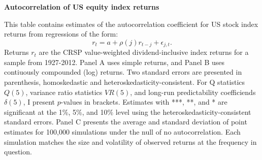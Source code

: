 \documentclass[12pt]{article}
\begin{document}
\clearpage

\begin{table}[h]
\caption{\textbf{Autocorrelation of US equity index returns}} \label{table_sighats}
\small{This table contains estimates of the autocorrelation coefficient for US stock index returns from regressions of the form: $$r_{t} = a + \rho(j) r_{t-j} + \epsilon_{j,t}.$$
Returns $r_t$ are the CRSP value-weighted dividend-inclusive index returns for a sample from 1927-2012. Panel A uses simple returns, and Panel B uses contiuously compounded (log) returns. Two standard errors are presented in parenthesis, homoskedastic and heteroskedasticity-consistent. For Q statistics $Q(5)$, variance ratio statistics $VR(5)$, and long-run predictability coefficiends $\delta(5)$, I present $p$-values in brackets. Estimates with ***, **, and * are significant at the 1\%, 5\%, and 10\% level using the heteroskedasticity-consistent standard errors. Panel C presents the average and standard deviation of point estimates for 100,000 simulations under the null of no autocorrelation. Each simulation matches the size and volatility of observed returns at the frequency in question.}

\vspace{12pt}
\footnotesize{

}
\end{table}

\clearpage


% 
\end{document}
